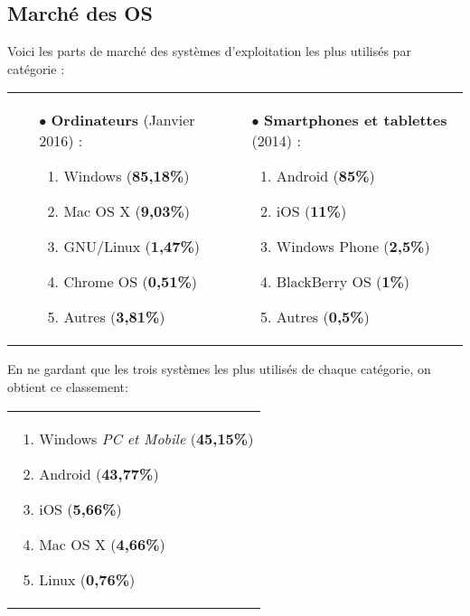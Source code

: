 \newpage

\subsection{Marché des OS}

Voici les parts de marché des systèmes d'exploitation les plus utilisés par
catégorie : \\

\begin{tabular} {p{7cm} p{8cm}}
	\begin{itemize}
  \item[$\bullet$] \textbf{Ordinateurs} (Janvier 2016) :
    \begin{enumerate}
    \item Windows (\textbf{85,18\%})
    \item Mac OS X (\textbf{9,03\%})
    \item GNU/Linux (\textbf{1,47\%})
    \item Chrome OS (\textbf{0,51\%})
    \item Autres (\textbf{3,81\%})
    \end{enumerate}
	\end{itemize}
	& \begin{itemize}
  \item[$\bullet$] \textbf{Smartphones et tablettes} (2014) :
    \begin{enumerate}
    \item Android (\textbf{85\%})
    \item iOS (\textbf{11\%})
    \item Windows Phone (\textbf{2,5\%})
    \item BlackBerry OS (\textbf{1\%})
    \item Autres (\textbf{0,5\%})
    \end{enumerate}
	\end{itemize}
\end{tabular}

En ne gardant que les trois systèmes les plus utilisés de chaque catégorie, on obtient ce classement:

\begin{center}
	\begin{tabular} {p{8cm}} \centering
		\begin{enumerate}
    \item Windows \textit{PC et Mobile} (\textbf{45,15\%})
    \item Android (\textbf{43,77\%})
    \item iOS (\textbf{5,66\%})
    \item Mac OS X (\textbf{4,66\%})
    \item Linux (\textbf{0,76\%})
		\end{enumerate}
	\end{tabular}
\end{center}

